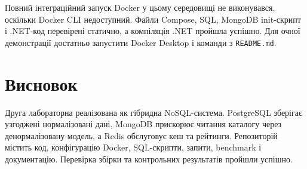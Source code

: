 \documentclass[12pt,a4paper]{article}
\begin{document}
Повний інтеграційний запуск Docker у цьому середовищі не виконувався, оскільки Docker CLI недоступний. Файли Compose, SQL, MongoDB init-скрипт і .NET-код перевірені статично, а компіляція .NET пройшла успішно. Для очної демонстрації достатньо запустити Docker Desktop і команди з \texttt{README.md}.

\section{Висновок}

Друга лабораторна реалізована як гібридна NoSQL-система. PostgreSQL зберігає узгоджені нормалізовані дані, MongoDB прискорює читання каталогу через денормалізовану модель, а Redis обслуговує кеш та рейтинги. Репозиторій містить код, конфігурацію Docker, SQL-скрипти, запити, benchmark і документацію. Перевірка збірки та контрольних результатів пройшли успішно.
\end{document}
